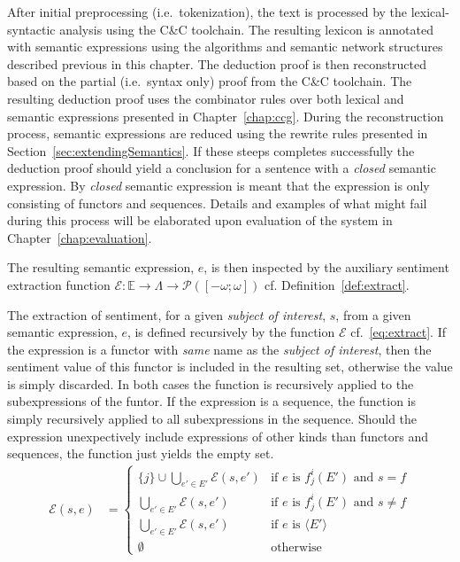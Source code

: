 After initial preprocessing (i.e.\ tokenization), the text is processed by the lexical-syntactic analysis using the C\&C toolchain. The resulting lexicon is annotated with semantic expressions using the algorithms and semantic network structures described previous in this chapter. The deduction proof is then reconstructed based on the partial (i.e.\ syntax only) proof from the C\&C toolchain. The resulting deduction proof uses the combinator rules over both lexical and semantic expressions presented in Chapter~\ref{chap:ccg}. During the reconstruction process, semantic expressions are reduced using the rewrite rules presented in Section~\ref{sec:extendingSemantics}. If these steeps completes successfully the deduction proof should yield a conclusion for a sentence with a \emph{closed} semantic expression. By \emph{closed} semantic expression is meant that the expression is only consisting of functors and sequences. Details and examples of what might fail during this process will be elaborated upon evaluation of the system in Chapter~\ref{chap:evaluation}.

The resulting semantic expression, $e$, is then inspected by the auxiliary sentiment extraction function $\mathcal{E} : \mathbb{E} \to \Lambda \to \mathcal{P}([-\omega; \omega])$ cf. Definition~\ref{def:extract}.
\begin{definition}
	The extraction of sentiment, for a given \emph{subject of interest}, $s$, from a given semantic expression, $e$, is defined recursively by the function $\mathcal{E}$ cf.\ \ref{eq:extract}. If the expression is a functor with \emph{same} name as the \emph{subject of interest}, then the sentiment value of this functor is included in the resulting set, otherwise the value is simply discarded. In both cases the function is recursively applied to the subexpressions of the funtor. If the expression is a sequence, the function is simply recursively applied to all subexpressions in the sequence. Should the expression unexpectively include expressions of other kinds than functors and sequences, the function just yields the empty set.
\begin{align}
	\mathcal{E}(s, e) &=
	\begin{cases}    
	\{j\} \cup \bigcup_{e' \in E'} \mathcal{E}(s, e') & \text{if $e$ is $f_j^i(E')$ and $s = f$}  \\
	\bigcup_{e' \in E'} \mathcal{E}(s, e') & \text{if $e$ is $f_j^i(E')$ and $s \neq f$} \\
	\bigcup_{e' \in E'} \mathcal{E}(s, e') & \text{if $e$ is $\langle E' \rangle$}\\
	\emptyset & \text{otherwise}
	\end{cases}
	\label{eq:extract}
\end{align}
\label{def:extract}
\done
\end{definition}

